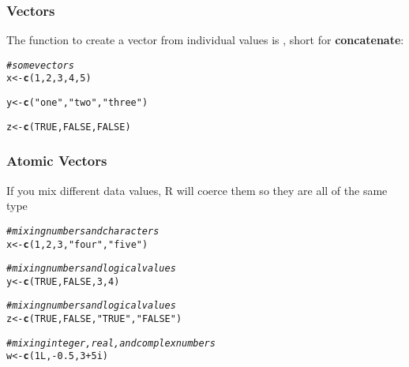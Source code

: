 \documentclass[12pt]{beamer}\usepackage[]{graphicx}\usepackage[]{color}
\makeatletter
\newcommand{\hlnum}[1]{\textcolor[rgb]{0.686,0.059,0.569}{#1}}%
\newcommand{\hlstr}[1]{\textcolor[rgb]{0.192,0.494,0.8}{#1}}%
\newcommand{\hlcom}[1]{\textcolor[rgb]{0.678,0.584,0.686}{\textit{#1}}}%
\newcommand{\hlopt}[1]{\textcolor[rgb]{0,0,0}{#1}}%
\newcommand{\hlstd}[1]{\textcolor[rgb]{0.345,0.345,0.345}{#1}}%
\newcommand{\hlkwb}[1]{\textcolor[rgb]{0.69,0.353,0.396}{#1}}%
\newcommand{\hlkwd}[1]{\textcolor[rgb]{0.737,0.353,0.396}{\textbf{#1}}}%
\newenvironment{kframe}{%
 \def\at@end@of@kframe{}%
 \ifinner\ifhmode%
  \def\at@end@of@kframe{\end{minipage}}%
  \begin{minipage}{\columnwidth}%
 \fi\fi%
 \def\FrameCommand##1{\hskip\@totalleftmargin \hskip-\fboxsep
 \colorbox{shadecolor}{##1}\hskip-\fboxsep
     \hskip-\linewidth \hskip-\@totalleftmargin \hskip\columnwidth}%
 \MakeFramed {\advance\hsize-\width
   \@totalleftmargin\z@ \linewidth\hsize
   \@setminipage}}%
 {\par\unskip\endMakeFramed%
 \at@end@of@kframe}
\newenvironment{knitrout}{}{} %
\makeatother
\begin{document}

\begin{frame}[fragile]
\frametitle{Vectors}

The function to create a vector from individual values is {\hilit {}}, short for \textbf{concatenate}:

\begin{knitrout}\footnotesize
{}\color{fgcolor}\begin{kframe}
\begin{alltt}
\hlcom{# some vectors}
\hlstd{x} \hlkwb{<-} \hlkwd{c}\hlstd{(}\hlnum{1}\hlstd{,} \hlnum{2}\hlstd{,} \hlnum{3}\hlstd{,} \hlnum{4}\hlstd{,} \hlnum{5}\hlstd{)}

\hlstd{y} \hlkwb{<-} \hlkwd{c}\hlstd{(}\hlstr{"one"}\hlstd{,} \hlstr{"two"}\hlstd{,} \hlstr{"three"}\hlstd{)}

\hlstd{z} \hlkwb{<-} \hlkwd{c}\hlstd{(}\hlnum{TRUE}\hlstd{,} \hlnum{FALSE}\hlstd{,} \hlnum{FALSE}\hlstd{)}
\end{alltt}
\end{kframe}
\end{knitrout}

\end{frame}


\begin{frame}[fragile]
\frametitle{Atomic Vectors}

If you mix different data values, R will coerce them so they are all of the same type
\begin{knitrout}\footnotesize
{}\color{fgcolor}\begin{kframe}
\begin{alltt}
\hlcom{# mixing numbers and characters}
\hlstd{x} \hlkwb{<-} \hlkwd{c}\hlstd{(}\hlnum{1}\hlstd{,} \hlnum{2}\hlstd{,} \hlnum{3}\hlstd{,} \hlstr{"four"}\hlstd{,} \hlstr{"five"}\hlstd{)}

\hlcom{# mixing numbers and logical values}
\hlstd{y} \hlkwb{<-} \hlkwd{c}\hlstd{(}\hlnum{TRUE}\hlstd{,} \hlnum{FALSE}\hlstd{,} \hlnum{3}\hlstd{,} \hlnum{4}\hlstd{)}

\hlcom{# mixing numbers and logical values}
\hlstd{z} \hlkwb{<-} \hlkwd{c}\hlstd{(}\hlnum{TRUE}\hlstd{,} \hlnum{FALSE}\hlstd{,} \hlstr{"TRUE"}\hlstd{,} \hlstr{"FALSE"}\hlstd{)}

\hlcom{# mixing integer, real, and complex numbers}
\hlstd{w} \hlkwb{<-} \hlkwd{c}\hlstd{(}\hlnum{1L}\hlstd{,} \hlopt{-}\hlnum{0.5}\hlstd{,} \hlnum{3} \hlopt{+} \hlnum{5i}\hlstd{)}
\end{alltt}
\end{kframe}
\end{knitrout}

\end{frame}
\end{document}

